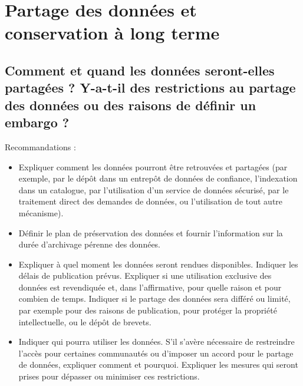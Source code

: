 \documentclass{article}
\begin{document}
\section{Partage des données et conservation à long terme}
\subsection{Comment et quand les données seront-elles partagées ? Y-a-t-il des restrictions au partage des données ou des raisons de définir un embargo ?}
Recommandations : 
\begin{itemize}
    \item Expliquer comment les données pourront être retrouvées et partagées (par exemple, par le dépôt dans un entrepôt de données de confiance, l'indexation dans un catalogue, par l’utilisation d'un service de données sécurisé, par le traitement direct des demandes de données, ou l'utilisation de tout autre mécanisme).
    \item Définir le plan de préservation des données et fournir l’information sur la durée d’archivage pérenne des données.
    \item Expliquer à quel moment les données seront rendues disponibles. Indiquer les délais de publication prévus. Expliquer si une utilisation exclusive des données est revendiquée et, dans l'affirmative, pour quelle raison et pour combien de temps. Indiquer si le partage des données sera différé ou limité, par exemple pour des raisons de publication, pour protéger la propriété intellectuelle, ou le dépôt de brevets. 
    \item Indiquer qui pourra utiliser les données. S'il s’avère nécessaire de restreindre l'accès pour certaines communautés ou d’imposer un accord pour le partage de données, expliquer comment et pourquoi. Expliquer les mesures qui seront prises pour dépasser ou minimiser ces restrictions.
\end{itemize}
\end{document}
